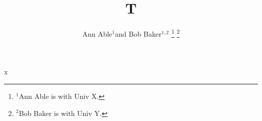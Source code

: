 \documentclass{article}
\begin{document}
\title{T}
\author{Ann Able$^{1}$and Bob Baker$^{1,2}$%
\thanks{$^{1}$Ann Able is with Univ X.}%
\thanks{$^{2}$Bob Baker is with Univ Y.}}
\maketitle
x
\end{document}
